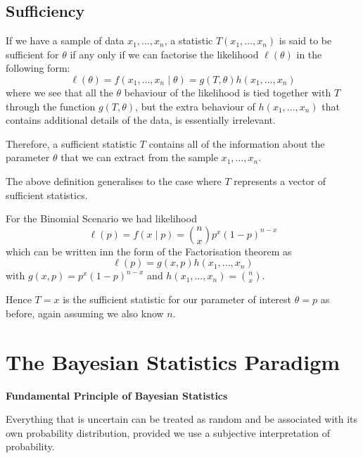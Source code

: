 \documentclass[10pt, a4paper]{article}
\begin{document}
\subsection{Sufficiency}

\begin{definition}[Sufficiency]
    If we have a sample of data $x_1, \dotsc, x_n$,
    a statistic $T(x_1, \dotsc, x_n)$ is said to be sufficient for $\theta$ if any only if we can factorise the likelihood $\ell(\theta)$ in the following form:
    \[
    \ell(\theta) = f(x_1, \dotsc, x_n\mid\theta) = g(T, \theta)h(x_1, \dotsc, x_n)
    \]
    where we see that all the $\theta$ behaviour of the likelihood is tied together with $T$ through the function $g(T, \theta)$,
    but the extra behaviour of $h(x_1, \dotsc, x_n)$ that contains additional details of the data,
    is essentially irrelevant.

    Therefore,
    a sufficient statistic $T$ contains all of the information about the parameter $\theta$ that we can extract from the sample $x_1, \dotsc, x_n$.

    The above definition generalises to the case where $T$ represents a vector of sufficient statistics.
\end{definition}

\begin{example}
    For the Binomial Scenario we had likelihood
    \[
    \ell(p) = f(x\mid p) = \binom{n}{x}p ^ x(1 - p) ^ {n - x}
    \]
    which can be written inn the form of the Factorisation theorem as
    \[
    \ell(p) = g(x, p)h(x_1, \dotsc, x_n)
    \]
    with $g(x, p) = p ^ x(1 - p) ^ {n - x}$ and $h(x_1, \dotsc, x_n) = \binom{n}{x}$.

    Hence $T = x$ is the sufficient statistic for our parameter of interest $\theta = p$ as before,
    again assuming we also know $n$.
\end{example}

\newpage

\section{The Bayesian Statistics Paradigm}

\textbf{Fundamental Principle of Bayesian Statistics}

Everything that is uncertain can be treated as random and be associated with its own probability distribution,
provided we use a subjective interpretation of probability.
\end{document}
